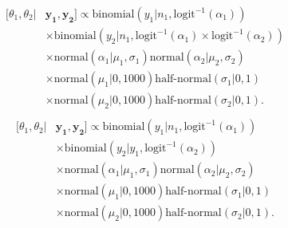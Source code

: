 \documentclass[12pt, oneside, titlepage]{article}   	%
\begin{document}
\begin{figure}[h]
\begin{subfigure}[c]{\textwidth}
\end{subfigure}
\end{figure}
%


\begin{align}
  \begin{split}
 [  \theta_1, \theta_2  | & \bm{y_1} , \bm{y_2} ] \propto 
   \mathrm{binomial} ( y_1 | n_1, \mathrm{logit}^{-1}( \alpha_1 ) )  
      \\ & \times \mathrm{binomial} ( y_2 | n_1, \mathrm{logit}^{-1}( \alpha_1 ) \times \mathrm{logit}^{-1}( \alpha_2 ) ) 
   \\ & \times \mathrm{normal} ( \alpha_1  | \mu_1, \sigma_1 ) \mathrm{normal} ( \alpha_2  | \mu_2, \sigma_2 )
  \\ & \times \mathrm{normal} ( \mu_1 | 0 , 1000 ) \textrm{half-normal} ( \sigma_1 | 0,1)
    \\ & \times \mathrm{normal} ( \mu_2 | 0 , 1000 ) \textrm{half-normal} ( \sigma_2 | 0,1).
  \end{split}
\end{align}
%
\begin{align}
  \begin{split}
 [  \theta_1, \theta_2  | & \bm{y_1} , \bm{y_2} ] \propto 
   \mathrm{binomial} ( y_1 | n_1, \mathrm{logit}^{-1}( \alpha_1 ) )
      \\ & \times  \mathrm{binomial} ( y_2 | y_1, \mathrm{logit}^{-1}( \alpha_2 ) ) 
   \\ & \times \mathrm{normal} ( \alpha_1  | \mu_1, \sigma_1 ) \mathrm{normal} ( \alpha_2  | \mu_2, \sigma_2 )
  \\ & \times \mathrm{normal} ( \mu_1 | 0 , 1000 ) \textrm{half-normal} ( \sigma_1 | 0,1)
    \\ & \times \mathrm{normal} ( \mu_2 | 0 , 1000 ) \textrm{half-normal} ( \sigma_2 | 0,1).
  \end{split}
\end{align}
%
\end{document}
